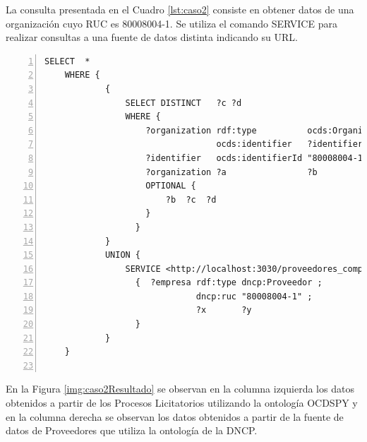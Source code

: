 La consulta presentada en el Cuadro \ref{lst:caso2} consiste en obtener datos de una organización cuyo RUC es 80008004-1. Se utiliza el comando SERVICE para realizar consultas a una fuente de datos distinta indicando su URL.

\noindent\begin{minipage}[c]{\textwidth}
\begin{lstlisting}[captionpos=b, caption={Consulta a dos fuentes de datos}, label={lst:caso2},  numbers=left,  numberstyle=\tiny\color{mygray},frame=single]
SELECT  *
    WHERE {   
            { 
                SELECT DISTINCT   ?c ?d
                WHERE { 
                    ?organization rdf:type          ocds:Organization ;
                                  ocds:identifier   ?identifier .
                    ?identifier   ocds:identifierId "80008004-1" .
                    ?organization ?a                ?b
                    OPTIONAL { 
                        ?b  ?c  ?d 
                    }
                  }
            }
            UNION {
                SERVICE <http://localhost:3030/proveedores_completas_no_inf/sparql>
                  {  ?empresa rdf:type dncp:Proveedor ;
                              dncp:ruc "80008004-1" ;
                              ?x       ?y
                  }
            }
    }
    
 \end{lstlisting}
\end{minipage}

 En la Figura \ref{img:caso2Resultado} se observan en la columna izquierda los datos obtenidos a partir de los Procesos Licitatorios utilizando la ontología OCDSPY y en la columna derecha se observan los datos obtenidos a partir de la fuente de datos de Proveedores que utiliza la ontología de la DNCP.


